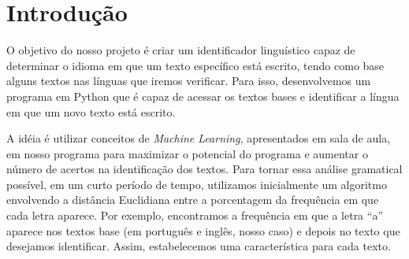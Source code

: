\section{Introdução}
O objetivo do nosso projeto é criar um identificador linguístico capaz de determinar o idioma em que um texto específico está escrito, tendo como base alguns textos nas línguas que iremos verificar. Para isso, desenvolvemos um programa em Python que é capaz de acessar os textos bases e identificar a língua em que um novo texto está escrito.

A idéia é utilizar conceitos de \emph{Machine Learning}, apresentados em sala de aula, em nosso programa para maximizar o potencial do programa e aumentar o número de acertos na identificação dos textos. Para tornar essa análise gramatical possível, em um curto período de tempo, utilizamos inicialmente um algoritmo envolvendo a distância Euclidiana entre a porcentagem da frequência em que cada letra aparece. Por exemplo, encontramos a frequência em que a letra “a” aparece nos textos base (em português e inglês, nosso caso) e depois no texto que desejamos identificar. Assim, estabelecemos uma característica para cada texto.

\nocite{iaml:11}
